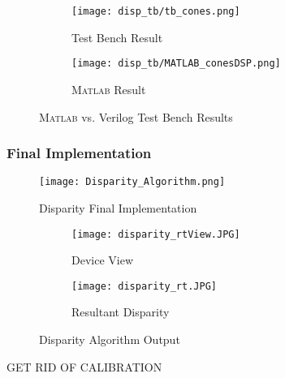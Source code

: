 \par
\begin{figure}[H] 
         \begin{subfigure}[h]{0.5\textwidth}
              \centerline{\texttt{[image: disp\_tb/tb\_cones.png]}}
             \caption{Test Bench Result}
         \end{subfigure}
         \begin{subfigure}[h]{0.5\textwidth}
             \centerline{\texttt{[image: disp\_tb/MATLAB\_conesDSP.png]}}
             \caption{\textsc{Matlab} Result}
         \end{subfigure}
\label{disparityVerilogvsMatlab}
\caption{\textsc{Matlab} vs. Verilog Test Bench Results}
\end{figure}


\subsubsection{Final Implementation}
\begin{figure}[H]
	\centerline{\texttt{[image: Disparity\_Algorithm.png]}}
	\caption{Disparity Final Implementation}
	\label{disparityTestImp}
\end{figure}
\par
\begin{figure}[H] 
	\begin{subfigure}{0.5\textwidth}
	\centering
		\texttt{[image: disparity\_rtView.JPG]}
		\caption{Device View}
	\end{subfigure}
	\begin{subfigure}{0.5\textwidth}
	\centering
		\texttt{[image: disparity\_rt.JPG]}
		\caption{Resultant Disparity}
	\end{subfigure}
	\caption{Disparity Algorithm Output}
	\label{disparityFin}
\end{figure}
\par
GET RID OF CALIBRATION 